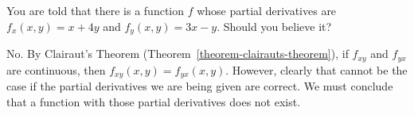 \begin{exercise}
	You are told that there is a function $f$ whose partial derivatives are $f_x\left(x,y\right)=x+4y$ and $f_y\left(x,y\right)=3x-y$. Should you believe it?
\end{exercise}
\begin{solution}
	No. By Clairaut's Theorem (Theorem~\ref{theorem-clairauts-theorem}), if $f_{xy}$ and $f_{yx}$ are continuous, then $f_{xy}\left(x,y\right)=f_{yx}\left(x,y\right)$. However, clearly that cannot be the case if the partial derivatives we are being given are correct. We must conclude that a function with those partial derivatives does not exist.
\end{solution}
